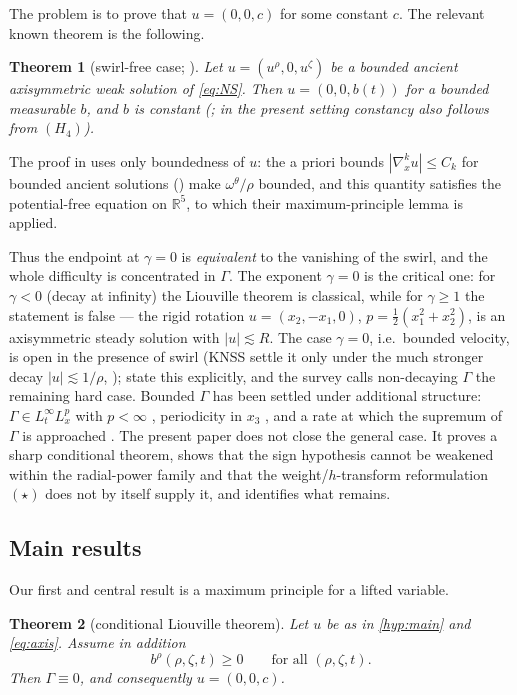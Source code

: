 \documentclass[11pt]{article}
\newtheorem{theorem}{Theorem}[section]
\theoremstyle{definition}
\newcommand{\R}{\mathbb{R}}
\begin{document}
The problem is to prove that $u=(0,0,c)$ for some constant $c$. The relevant
known theorem is the following.

\begin{theorem}[swirl-free case; {\cite[Theorem~5.2]{KNSS}}]\label{thm:KNSS}
Let $u=(u^\rho,0,u^\zeta)$ be a bounded ancient axisymmetric weak solution of
\eqref{eq:NS}. Then $u=(0,0,b(t))$ for a bounded measurable $b$, and $b$ is
constant (\cite[Remark~6.1]{KNSS}; in the present setting constancy also
follows from $(H_4)$).
\end{theorem}
The proof in \cite{KNSS} uses only boundedness of $u$: the a priori bounds
$|\nabla^k_xu|\le C_k$ for bounded ancient solutions (\cite[Section~4]{KNSS})
make $\omega^\theta/\rho$ bounded, and this quantity satisfies the
potential-free equation \cite[eq.~(5.16)]{KNSS} on $\R^5$, to which their
maximum-principle lemma is applied.

Thus the endpoint at $\gamma=0$ is \emph{equivalent} to the vanishing of the
swirl, and the whole difficulty is concentrated in $\Gamma$. The exponent
$\gamma=0$ is the critical one: for $\gamma<0$ (decay at infinity) the Liouville
theorem is classical, while for $\gamma\ge1$ the statement is false --- the
rigid rotation $u=(x_2,-x_1,0)$, $p=\tfrac12(x_1^2+x_2^2)$, is an
axisymmetric steady solution with $|u|\lesssim R$. The case $\gamma=0$, i.e.\
bounded velocity, is open in the
presence of swirl (KNSS settle it only under the much stronger decay
$|u|\lesssim1/\rho$, \cite[Theorem~5.3]{KNSS}); \cite[Section~5]{KNSS} state
this explicitly, and the survey \cite{PZ} calls non-decaying $\Gamma$ the remaining
hard case. Bounded $\Gamma$ has been settled under additional structure:
$\Gamma\in L^\infty_tL^p_x$ with $p<\infty$ \cite{LZZ}, periodicity in $x_3$
\cite{LRZperiodic}, and a rate at which the supremum of $\Gamma$ is approached
\cite{LRZrate}. The present paper does not close the general case. It proves a
sharp conditional theorem, shows that the sign hypothesis cannot be weakened
within the radial-power family and that the weight/$h$-transform reformulation
$(\star)$ does not by itself supply it, and identifies what remains.

\subsection{Main results}
Our first and central result is a maximum principle for a lifted variable.

\begin{theorem}[conditional Liouville theorem]\label{thm:main}
Let $u$ be as in \cref{hyp:main} and \eqref{eq:axis}. Assume in addition
\begin{equation}\label{eq:Hsign}
b^\rho(\rho,\zeta,t)\ge0\qquad\text{for all }(\rho,\zeta,t).
\end{equation}
Then $\Gamma\equiv0$, and consequently $u=(0,0,c)$.
\end{theorem}
\end{document}
